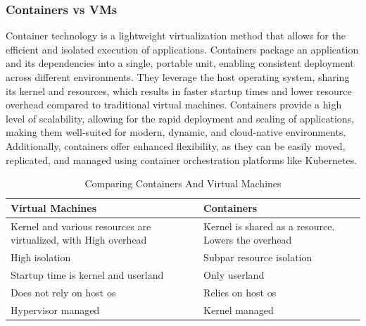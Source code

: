 \documentclass[a4paper, 11pt, twocolumn]{article}
\theoremstyle{nonumberplain}
\begin{document}
\subsubsection{Containers vs VMs}
Container technology is a lightweight virtualization method that allows for
the efficient and isolated execution of applications.
Containers package an application and its dependencies into a single,
portable unit, enabling consistent deployment across different environments.
They leverage the host operating system, sharing its kernel and resources,
which results in faster startup times and lower resource overhead compared to
traditional virtual machines. Containers provide a high level of scalability,
allowing for the rapid deployment and scaling of applications, making them
well-suited for modern, dynamic, and cloud-native environments. Additionally,
containers offer enhanced flexibility, as they can be easily moved,
replicated, and managed using container orchestration platforms like
Kubernetes.
\begin{table}[H]
    \centering
    \begin{tabular}{|p{}|p{}|} \hline
        Virtual Machines & Containers \\ \hline
        Kernel and various resources are virtualized, with High overhead
        & Kernel is shared as a resource. Lowers the overhead \\ \hline
        High isolation & Subpar resource isolation \\ \hline
        Startup time is kernel and userland & Only userland \\ \hline
        Does not rely on host os & Relies on host os \\ \hline
        Hypervisor managed & Kernel managed \\ \hline
    \end{tabular}
    \caption{Comparing Containers And Virtual Machines}
\end{table}
\end{document}
